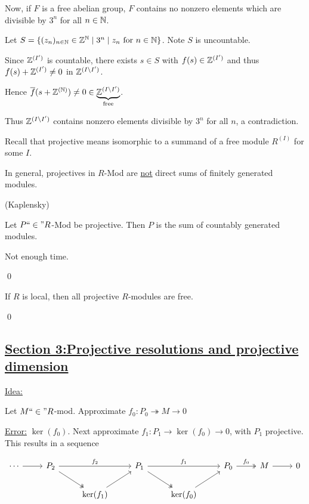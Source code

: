 \documentclass[x11names,reqno,14pt]{extarticle}
\newcommand{\fin}{``\in"}
\newcommand{\barf}{\bar{f}}
\begin{document}
Now, if $F$ is a free abelian group, $F$ contains no nonzero elements which are divisible by $3^n$ for all $n\in\mathbb{N}$. 

Let $S = \{(z_n)_{n\in\mathbb{N}}\in\mathbb{Z}^{\mathbb{N}} \mid 3^n \mid z_n\text{ for }n\in\mathbb{N}\}$. Note $S$ is uncountable. 

Since $\mathbb{Z}^{(I')}$ is countable, there exists $s\in S$ with $f(s) \in \mathbb{Z}^{(I')}$ and thus $f(s) + \mathbb{Z}^{(I')}\neq0$ in $\mathbb{Z}^{(I\setminus I')}$.

Hence $\barf(s + \Z^{(\N)}) \neq 0\in\underbrace{\Z^{(I\setminus I')}}_{\text{free}}$.

Thus $\mathbb{Z}^{(I\setminus I')}$ contains nonzero elements divisible by $3^n$ for all $n$, a contradiction. 

Recall that projective means isomorphic to a summand of a free module $R^{(I)}$ for some $I$. 

\dbend\dbend\dbend


In general, projectives in $R$-Mod are \underline{not} direct sums of finitely generated modules. 

\thm (Kaplensky)

Let $P\fin R$-Mod be projective. Then $P$ is the sum of countably generated modules. 

\proof

Not enough time. 

\qed

\cor

If $R$ is local, then all projective $R$-modules are free.

\proof

\qed

\subsection*{\underline{Section 3:Projective resolutions and projective dimension}}

\underline{Idea:} 

Let $M\fin R$-mod. Approximate $f_0:P_0\twoheadrightarrow M\to 0$

\underline{Error:} $\ker(f_0)$. Next approximate $f_1:P_1\to\ker(f_0)\to0$, with $P_1$ projective. This results in a sequence

\[
\begin{tikzcd}
\cdots\ar[r]&P_2\ar[dr, twoheadrightarrow] \ar[rr, "f_2"]&&P_1\ar[rr, "f_1"] \ar[dr, twoheadrightarrow]&&P_0\ar[r, twoheadrightarrow, "f_0"]&M\ar[r]&0 \\ &
&\ker(f_1)\ar[ur]& &\ker(f_0)\ar[ur]& &\\
\end{tikzcd}
\]
\end{document}
